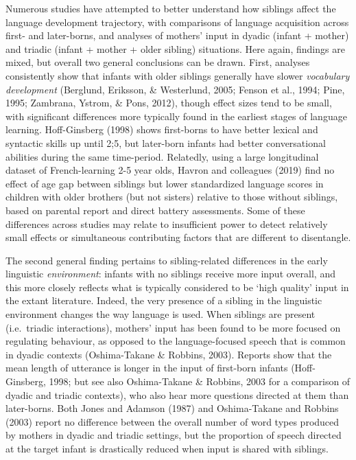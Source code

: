 \documentclass[
  english,
  man,floatsintext]{apa6}
\begin{document}
Numerous studies have attempted to better understand how siblings affect the language development trajectory, with comparisons of language acquisition across first- and later-borns, and analyses of mothers' input in dyadic (infant + mother) and triadic (infant + mother + older sibling) situations. Here again, findings are mixed, but overall two general conclusions can be drawn. First, analyses consistently show that infants with older siblings generally have slower \emph{vocabulary development} (Berglund, Eriksson, \& Westerlund, 2005; Fenson et al., 1994; Pine, 1995; Zambrana, Ystrom, \& Pons, 2012), though effect sizes tend to be small, with significant differences more typically found in the earliest stages of language learning. Hoff-Ginsberg (1998) shows first-borns to have better lexical and syntactic skills up until 2;5, but later-born infants had better conversational abilities during the same time-period. Relatedly, using a large longitudinal dataset of French-learning 2-5 year olds, Havron and colleagues (2019) find no effect of age gap between siblings but lower standardized language scores in children with older brothers (but not sisters) relative to those without siblings, based on parental report and direct battery assessments. Some of these differences across studies may relate to insufficient power to detect relatively small effects or simultaneous contributing factors that are different to disentangle.

The second general finding pertains to sibling-related differences in the early linguistic \emph{environment}: infants with no siblings receive more input overall, and this more closely reflects what is typically considered to be `high quality' input in the extant literature. Indeed, the very presence of a sibling in the linguistic environment changes the way language is used. When siblings are present (i.e.~triadic interactions), mothers' input has been found to be more focused on regulating behaviour, as opposed to the language-focused speech that is common in dyadic contexts (Oshima-Takane \& Robbins, 2003). Reports show that the mean length of utterance is longer in the input of first-born infants (Hoff-Ginsberg, 1998; but see also Oshima-Takane \& Robbins, 2003 for a comparison of dyadic and triadic contexts), who also hear more questions directed at them than later-borns. Both Jones and Adamson (1987) and Oshima-Takane and Robbins (2003) report no difference between the overall number of word types produced by mothers in dyadic and triadic settings, but the proportion of speech directed at the target infant is drastically reduced when input is shared with siblings.
\end{document}
